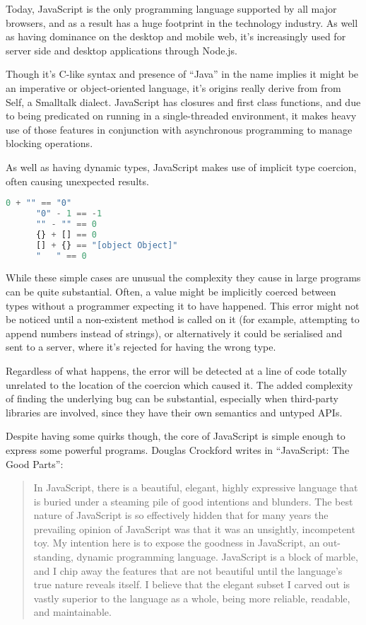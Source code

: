 \documentclass[british, twoside]{bhamthesis}
\theoremstyle{definition}
\begin{document}
    Today, JavaScript is the only programming language supported by all major browsers, and as a result has a huge footprint in the technology industry. As well as having dominance on the desktop and mobile web, it's increasingly used for server side and desktop applications through Node.js.

    Though it’s C-like syntax and presence of “Java” in the name implies it might be an imperative or object-oriented language, it’s origins really derive from from Self, a Smalltalk dialect. JavaScript has closures and first class functions, and due to being predicated on running in a single-threaded environment, it makes heavy use of those features in conjunction with asynchronous programming to manage blocking operations.

    As well as having dynamic types, JavaScript makes use of implicit type coercion, often causing unexpected results.

    \begin{lstlisting}[language=JavaScript]
      0 + "" == "0"
      "0" - 1 == -1
      "" - "" == 0
      {} + [] == 0
      [] + {} == "[object Object]"
      "   " == 0
    \end{lstlisting}

    While these simple cases are unusual the complexity they cause in large programs can be quite substantial. Often, a value might be implicitly coerced between types without a programmer expecting it to have happened. This error might not be noticed until a non-existent method is called on it (for example, attempting to append numbers instead of strings), or alternatively it could be serialised and sent to a server, where it's rejected for having the wrong type.

    Regardless of what happens, the error will be detected at a line of code totally unrelated to the location of the coercion which caused it. The added complexity of finding the underlying bug can be substantial, especially when third-party libraries are involved, since they have their own semantics and untyped APIs.

    Despite having some quirks though, the core of JavaScript is simple enough to express some powerful programs. Douglas Crockford writes in “JavaScript: The Good Parts”:

    \begin{quote}
      In JavaScript, there is a beautiful, elegant, highly expressive language that is buried under a steaming pile of good intentions and blunders. The best nature of JavaScript is so effectively hidden that for many years the prevailing opinion of JavaScript was that it was an unsightly, incompetent toy. My intention here is to expose the goodness in JavaScript, an out- standing, dynamic programming language. JavaScript is a block of marble, and I chip away the features that are not beautiful until the language’s true nature reveals itself. I believe that the elegant subset I carved out is vastly superior to the language as a whole, being more reliable, readable, and maintainable.
    \end{quote}
    \autocite{Crockford2008}
\end{document}
